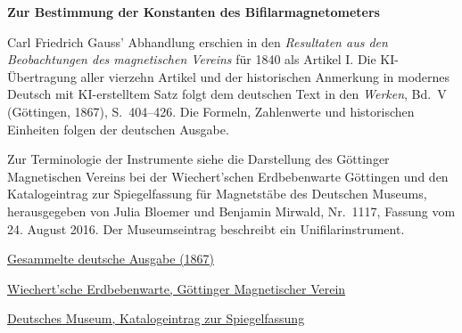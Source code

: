 \clearpage
\thispagestyle{empty}
\begin{center}\Large\textbf{Zur Bestimmung der Konstanten des Bifilarmagnetometers}\end{center}

Carl Friedrich Gauss’ Abhandlung erschien in den \textit{Resultaten aus den Beobachtungen des magnetischen Vereins} für 1840 als Artikel I. Die KI-Übertragung aller vierzehn Artikel und der historischen Anmerkung in modernes Deutsch mit KI-erstelltem Satz folgt dem deutschen Text in den \textit{Werken}, Bd.~V (Göttingen, 1867), S.~404--426. Die Formeln, Zahlenwerte und historischen Einheiten folgen der deutschen Ausgabe.

\medskip\noindent
Zur Terminologie der Instrumente siehe die Darstellung des Göttinger Magnetischen Vereins bei der Wiechert’schen Erdbebenwarte Göttingen und den Katalogeintrag zur Spiegelfassung für Magnetstäbe des Deutschen Museums, herausgegeben von Julia Bloemer und Benjamin Mirwald, Nr.~1117, Fassung vom 24. August 2016. Der Museumseintrag beschreibt ein Unifilarinstrument.

\medskip\noindent
\href{https://gdz.sub.uni-goettingen.de/id/PPN236006339}{Gesammelte deutsche Ausgabe (1867)}\par
\noindent\href{https://www.erdbebenwarte.de/goettinger-magnetischer-verein/}{Wiechert’sche Erdbebenwarte, Göttinger Magnetischer Verein}\par
\noindent\href{https://digital.deutsches-museum.de/projekte/gruendungssammlung/detail/1117/}{Deutsches Museum, Katalogeintrag zur Spiegelfassung}
\clearpage
